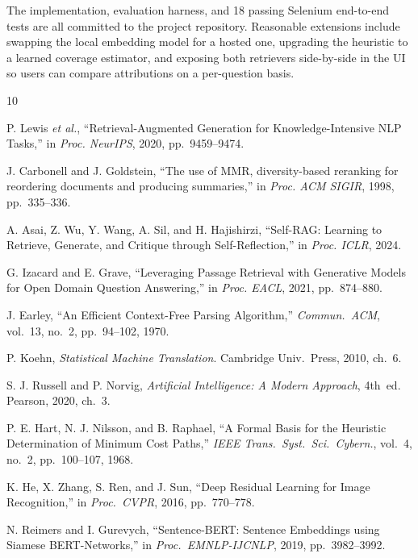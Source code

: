 \documentclass[conference]{IEEEtran}
\begin{document}
The implementation, evaluation harness, and 18 passing Selenium end-to-end
tests are all committed to the project repository. Reasonable extensions
include swapping the local embedding model for a hosted one, upgrading the
heuristic to a learned coverage estimator, and exposing both retrievers
side-by-side in the UI so users can compare attributions on a per-question
basis.

\balance
\begin{thebibliography}{10}

P. Lewis \textit{et al.},
``Retrieval-Augmented Generation for Knowledge-Intensive NLP Tasks,''
in \textit{Proc. NeurIPS}, 2020, pp.~9459--9474.

J. Carbonell and J. Goldstein,
``The use of MMR, diversity-based reranking for reordering documents and
producing summaries,''
in \textit{Proc. ACM SIGIR}, 1998, pp.~335--336.

A. Asai, Z. Wu, Y. Wang, A. Sil, and H. Hajishirzi,
``Self-RAG: Learning to Retrieve, Generate, and Critique through
Self-Reflection,''
in \textit{Proc. ICLR}, 2024.

G. Izacard and E. Grave,
``Leveraging Passage Retrieval with Generative Models for Open Domain
Question Answering,''
in \textit{Proc. EACL}, 2021, pp.~874--880.

J. Earley,
``An Efficient Context-Free Parsing Algorithm,''
\textit{Commun.\ ACM}, vol.~13, no.~2, pp.~94--102, 1970.

P. Koehn,
\textit{Statistical Machine Translation}.
Cambridge Univ.\ Press, 2010, ch.~6.

S. J. Russell and P. Norvig,
\textit{Artificial Intelligence: A Modern Approach}, 4th~ed.
Pearson, 2020, ch.~3.

P. E. Hart, N. J. Nilsson, and B. Raphael,
``A Formal Basis for the Heuristic Determination of Minimum Cost Paths,''
\textit{IEEE Trans.\ Syst.\ Sci.\ Cybern.}, vol.~4, no.~2,
pp.~100--107, 1968.

K. He, X. Zhang, S. Ren, and J. Sun,
``Deep Residual Learning for Image Recognition,''
in \textit{Proc.\ CVPR}, 2016, pp.~770--778.

N. Reimers and I. Gurevych,
``Sentence-BERT: Sentence Embeddings using Siamese BERT-Networks,''
in \textit{Proc.\ EMNLP-IJCNLP}, 2019, pp.~3982--3992.

\end{thebibliography}
\end{document}
